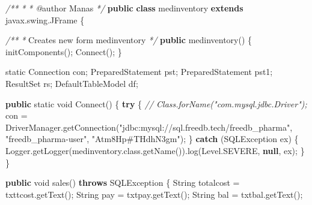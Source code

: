 \documentclass[
  10pt,
]{article}
\newenvironment{Shaded}{}{}
\newcommand{\BuiltInTok}[1]{\textcolor[rgb]{0.00,0.50,0.00}{#1}}
\newcommand{\CommentTok}[1]{\textcolor[rgb]{0.38,0.63,0.69}{\textit{#1}}}
\newcommand{\ControlFlowTok}[1]{\textcolor[rgb]{0.00,0.44,0.13}{\textbf{#1}}}
\newcommand{\DataTypeTok}[1]{\textcolor[rgb]{0.56,0.13,0.00}{#1}}
\newcommand{\FunctionTok}[1]{\textcolor[rgb]{0.02,0.16,0.49}{#1}}
\newcommand{\KeywordTok}[1]{\textcolor[rgb]{0.00,0.44,0.13}{\textbf{#1}}}
\newcommand{\NormalTok}[1]{#1}
\newcommand{\OperatorTok}[1]{\textcolor[rgb]{0.40,0.40,0.40}{#1}}
\newcommand{\StringTok}[1]{\textcolor[rgb]{0.25,0.44,0.63}{#1}}
\begin{document}
\begin{Shaded}
\begin{Highlighting}[numbers=left,,]
\CommentTok{/**}
 \CommentTok{*}
\CommentTok{ * @}\NormalTok{author Manas}
 \CommentTok{*/}
\KeywordTok{public} \KeywordTok{class}\NormalTok{ medinventory }\KeywordTok{extends}\NormalTok{ javax}\OperatorTok{.}\FunctionTok{swing}\OperatorTok{.}\FunctionTok{JFrame} \OperatorTok{\{}

    \CommentTok{/**}
     \CommentTok{*}\NormalTok{ Creates new form medinventory}
     \CommentTok{*/}
    \KeywordTok{public} \FunctionTok{medinventory}\OperatorTok{()} \OperatorTok{\{}
        \FunctionTok{initComponents}\OperatorTok{();}
        \FunctionTok{Connect}\OperatorTok{();}
    \OperatorTok{\}}

    \DataTypeTok{static} \BuiltInTok{Connection}\NormalTok{ con}\OperatorTok{;}
    \BuiltInTok{PreparedStatement}\NormalTok{ pst}\OperatorTok{;}
    \BuiltInTok{PreparedStatement}\NormalTok{ pst1}\OperatorTok{;}
    \BuiltInTok{ResultSet}\NormalTok{ rs}\OperatorTok{;}
    \BuiltInTok{DefaultTableModel}\NormalTok{ df}\OperatorTok{;}

    \KeywordTok{public} \DataTypeTok{static} \DataTypeTok{void} \FunctionTok{Connect}\OperatorTok{()} \OperatorTok{\{}
        \ControlFlowTok{try} \OperatorTok{\{}
            \CommentTok{// Class.forName("com.mysql.jdbc.Driver");}
\NormalTok{            con }\OperatorTok{=} \BuiltInTok{DriverManager}\OperatorTok{.}\FunctionTok{getConnection}\OperatorTok{(}\StringTok{"jdbc:mysql://sql.freedb.tech/freedb\_pharma"}\OperatorTok{,}
                    \StringTok{"freedb\_pharma{-}user"}\OperatorTok{,}
                    \StringTok{"Atm8Hp\#THdhN3gm"}\OperatorTok{);}
        \OperatorTok{\}} \ControlFlowTok{catch} \OperatorTok{(}\BuiltInTok{SQLException}\NormalTok{ ex}\OperatorTok{)} \OperatorTok{\{}
            \BuiltInTok{Logger}\OperatorTok{.}\FunctionTok{getLogger}\OperatorTok{(}\NormalTok{medinventory}\OperatorTok{.}\FunctionTok{class}\OperatorTok{.}\FunctionTok{getName}\OperatorTok{()).}\FunctionTok{log}\OperatorTok{(}\BuiltInTok{Level}\OperatorTok{.}\FunctionTok{SEVERE}\OperatorTok{,} \KeywordTok{null}\OperatorTok{,}\NormalTok{ ex}\OperatorTok{);}
        \OperatorTok{\}}
    \OperatorTok{\}}

    \KeywordTok{public} \DataTypeTok{void} \FunctionTok{sales}\OperatorTok{()} \KeywordTok{throws} \BuiltInTok{SQLException} \OperatorTok{\{}
        \BuiltInTok{String}\NormalTok{ totalcost }\OperatorTok{=}\NormalTok{ txttcost}\OperatorTok{.}\FunctionTok{getText}\OperatorTok{();}
        \BuiltInTok{String}\NormalTok{ pay }\OperatorTok{=}\NormalTok{ txtpay}\OperatorTok{.}\FunctionTok{getText}\OperatorTok{();}
        \BuiltInTok{String}\NormalTok{ bal }\OperatorTok{=}\NormalTok{ txtbal}\OperatorTok{.}\FunctionTok{getText}\OperatorTok{();}


\end{Highlighting}
\end{Shaded}
\end{document}
